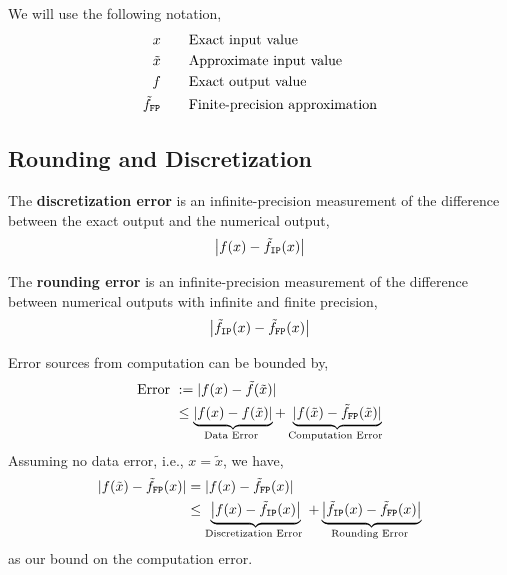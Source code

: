 \begin{marginfigure}
    We will use the following notation,
    \begin{align*}
        x &\quad\quad \text{Exact input value} \\
        \tilde{x} &\quad\quad \text{Approximate input value} \\
        f &\quad\quad \text{Exact output value} \\
        \tilde{f}_{\texttt{FP}} &\quad\quad \text{Finite-precision approximation}
    \end{align*}
\end{marginfigure}

\subsection{Rounding and Discretization}
\begin{defn}
    \sloppy The \textbf{discretization error} is an infinite-precision measurement of the difference between the exact output and the numerical output,
    \[\left|f(x)-\tilde{f}_{\texttt{IP}}(x)\right|\]
\end{defn}

\begin{defn}
   \sloppy The \textbf{rounding error} is an infinite-precision measurement of the difference between numerical outputs with infinite and finite precision,
   \[\left|\tilde{f}_{\texttt{IP}}(x)-\tilde{f}_{\texttt{FP}}(x)\right|\]
\end{defn}

\begin{rmk}
   Error sources from computation can be bounded by,
   \begin{align*}
    \text { Error } &:=|f(x)-\tilde{f}(\tilde{x})| \\
    & \leq \underbrace{|f(x)-f(\tilde{x})|}_{\text {Data Error }}+\underbrace{|f(\tilde{x})-\tilde{f}_{\texttt{FP}}(\tilde{x})|}_{\text {Computation Error }}
    \end{align*}
    Assuming no data error, i.e., $x = \tilde{x}$, we have, 
    \begin{align*}
        |f(\tilde{x})-\tilde{f}_{\texttt{FP}}(x)| &= |f(x)-\tilde{f}_{\texttt{FP}}(x)| \\
        &\leq \underbrace{\left|f(x)-\tilde{f}_{\texttt{IP}}(x)\right|}_{\text {Discretization Error }}+\underbrace{\left|\tilde{f}_{\texttt{IP}}(x)-\tilde{f}_{\texttt{FP}}(x)\right|}_{\text {Rounding Error }}
    \end{align*}
    as our bound on the computation error.
\end{rmk}

